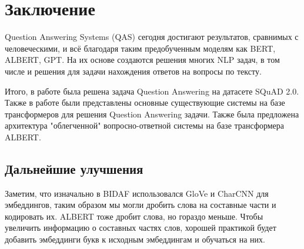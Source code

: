 \documentclass{article}
\begin{document}
\section{Заключение}

Question Answering Systems (QAS) сегодня достигают результатов, сравнимых с человеческими, и всё благодаря таким предобученным моделям как BERT, ALBERT, GPT. На их основе создаются решения многих NLP задач, в том числе и решения для задачи нахождения ответов на вопросы по тексту.

Итого, в работе была решена задача Question Answering на датасете SQuAD 2.0. Также в работе были представлены основные существующие системы на базе трансформеров для решения Question Answering задачи. Также была предложена архитектура "облегченной" вопросно-ответной системы на базе трансформера ALBERT.

\subsection{Дальнейшие улучшения}
Заметим, что изначально в BIDAF использовался GloVe и CharCNN для эмбеддингов, таким образом мы могли дробить слова на составные части и кодировать их. ALBERT тоже дробит слова, но гораздо меньше. Чтобы увеличить информацию о составных частях слов, хорошей практикой будет добавить эмбеддинги букв к исходным эмбеддингам и обучаться на них.



\end{document}
